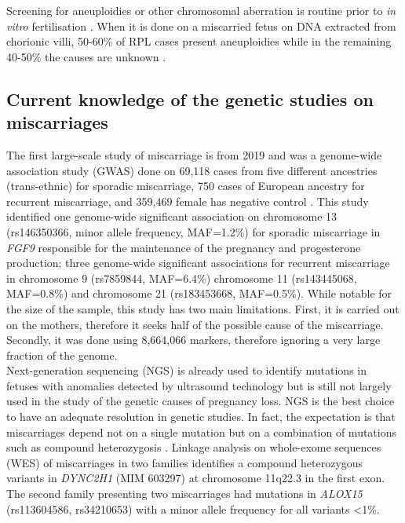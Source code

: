 Screening for aneuploidies or other chromosomal aberration is routine prior to \textit{in vitro} fertilisation \cite{driscoll2008first}. When it is done on a miscarried fetus on DNA extracted from chorionic villi, 50-60\% of RPL cases present aneuploidies while in the remaining 40-50\% the causes are unknown \cite{pmid27994187, pmid25944391, pmid11821293, stephenson2002cytogenetic, pmid22796359, pmid22672580, pmid25681385, gaboon2013recurrent, pmid30642578}.\\


\subsection{Current knowledge of the genetic studies on miscarriages}
The first large-scale study of miscarriage is from 2019 and was a genome-wide association study (GWAS) done on 69,118 cases from five different ancestries (trans-ethnic) for sporadic miscarriage, 750 cases of European ancestry for recurrent miscarriage, and 359,469 female has negative control \cite{laisk2019genetic}. This study identified one genome-wide significant association on chromosome 13 (rs146350366, minor allele frequency, MAF=1.2\%) for sporadic miscarriage in \textit{FGF9} responsible for the maintenance of the pregnancy and progesterone production; three genome-wide significant associations for recurrent miscarriage in chromosome 9 (rs7859844, MAF=6.4\%) chromosome 11 (rs143445068, MAF=0.8\%) and chromosome 21 (rs183453668, MAF=0.5\%). While notable for the size of the sample, this study has two main limitations. First, it is carried out on the mothers, therefore it seeks half of the possible cause of the miscarriage. Secondly, it was done using 8,664,066 markers, therefore ignoring a very large fraction of the genome. \\

Next-generation sequencing (NGS) is already used to identify mutations in fetuses with anomalies detected by ultrasound technology but is still not largely used in the study of the genetic causes of pregnancy loss. NGS is the best choice to have an adequate resolution in genetic studies. In fact, the expectation is that miscarriages depend not on a single mutation but on a combination of mutations such as compound heterozygosis \cite{qiao2016whole}. Linkage analysis on whole-exome sequences (WES) of miscarriages in two families identifies a compound heterozygous variants in \textit{DYNC2H1} (MIM 603297) at chromosome 11q22.3 in the first exon. The second family presenting two miscarriages had mutations in \textit{ALOX15} (rs113604586, rs34210653) with a minor allele frequency for all variants <1\%.\\

